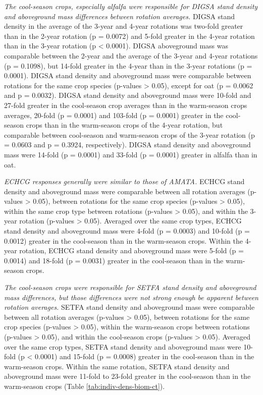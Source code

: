 \documentclass[
]{article}
\begin{document}
\emph{The cool-season crops, especially alfalfa were responsible for DIGSA stand density and aboveground mass differences between rotation averages.} DIGSA stand density in the average of the 3-year and 4-year rotations was two-fold greater than in the 2-year rotation (p = 0.0072) and 5-fold greater in the 4-year rotation than in the 3-year rotation (p \textless{} 0.0001). DIGSA aboveground mass was comparable between the 2-year and the average of the 3-year and 4-year rotations (p = 0.1098), but 14-fold greater in the 4-year than in the 3-year rotations (p = 0.0001). DIGSA stand density and aboveground mass were comparable between rotations for the same crop species (p-values \textgreater{} 0.05), except for oat (p = 0.0062 and p = 0.0032). DIGSA stand density and aboveground mass were 10-fold and 27-fold greater in the cool-season crop averages than in the warm-season crops averages, 20-fold (p = 0.0001) and 103-fold (p = 0.0001) greater in the cool-season crops than in the warm-season crops of the 4-year rotation, but comparable between cool-season and warm-season crops of the 3-year rotation (p = 0.0603 and p = 0.3924, respectively). DIGSA stand density and aboveground mass were 14-fold (p = 0.0001) and 33-fold (p = 0.0001) greater in alfalfa than in oat.

\emph{ECHCG responses generally were similar to those of AMATA.} ECHCG stand density and aboveground mass were comparable between all rotation averages (p-values \textgreater{} 0.05), between rotations for the same crop species (p-values \textgreater{} 0.05), within the same crop type between rotations (p-values \textgreater{} 0.05), and within the 3-year rotation (p-values \textgreater{} 0.05). Averaged over the same crop types, ECHCG stand density and aboveground mass were 4-fold (p = 0.0003) and 10-fold (p = 0.0012) greater in the cool-season than in the warm-season crops. Within the 4-year rotation, ECHCG stand density and aboveground mass were 5-fold (p = 0.0014) and 18-fold (p = 0.0031) greater in the cool-season than in the warm-season crops.

\emph{The cool-season crops were responsible for SETFA stand density and aboveground mass differences, but those differences were not strong enough be apparent between rotation averages.} SETFA stand density and aboveground mass were comparable between all rotation averages (p-values \textgreater{} 0.05), between rotations for the same crop species (p-values \textgreater{} 0.05), within the warm-season crops between rotations (p-values \textgreater{} 0.05), and within the cool-season crops (p-values \textgreater{} 0.05). Averaged over the same crop types, SETFA stand density and aboveground mass were 10-fold (p \textless{} 0.0001) and 15-fold (p = 0.0008) greater in the cool-season than in the warm-season crops. Within the same rotation, SETFA stand density and aboveground mass were 11-fold to 23-fold greater in the cool-season than in the warm-season crops (Table \ref{tab:indiv-dens-biom-ct}).
\end{document}
